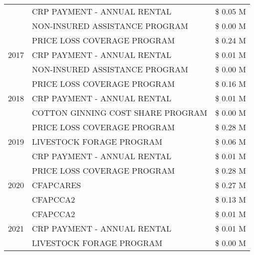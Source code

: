 \begin{tabular}{llr}
 & CRP PAYMENT - ANNUAL RENTAL & \$ 0.05 M \\
 & NON-INSURED ASSISTANCE PROGRAM & \$ 0.00 M \\
\cline{1-3}
\multirow[t]{3}{*}{2017} & PRICE LOSS COVERAGE PROGRAM & \$ 0.24 M \\
 & CRP PAYMENT - ANNUAL RENTAL & \$ 0.01 M \\
 & NON-INSURED ASSISTANCE PROGRAM & \$ 0.00 M \\
\cline{1-3}
\multirow[t]{3}{*}{2018} & PRICE LOSS COVERAGE PROGRAM & \$ 0.16 M \\
 & CRP PAYMENT - ANNUAL RENTAL & \$ 0.01 M \\
 & COTTON GINNING COST SHARE PROGRAM & \$ 0.00 M \\
\cline{1-3}
\multirow[t]{3}{*}{2019} & PRICE LOSS COVERAGE PROGRAM & \$ 0.28 M \\
 & LIVESTOCK FORAGE PROGRAM & \$ 0.06 M \\
 & CRP PAYMENT - ANNUAL RENTAL & \$ 0.01 M \\
\cline{1-3}
\multirow[t]{3}{*}{2020} & PRICE LOSS COVERAGE PROGRAM & \$ 0.28 M \\
 & CFAPCARES & \$ 0.27 M \\
 & CFAPCCA2 & \$ 0.13 M \\
\cline{1-3}
\multirow[t]{3}{*}{2021} & CFAPCCA2 & \$ 0.01 M \\
 & CRP PAYMENT - ANNUAL RENTAL & \$ 0.01 M \\
 & LIVESTOCK FORAGE PROGRAM & \$ 0.00 M \\
\cline{1-3}
\bottomrule
\end{tabular}

